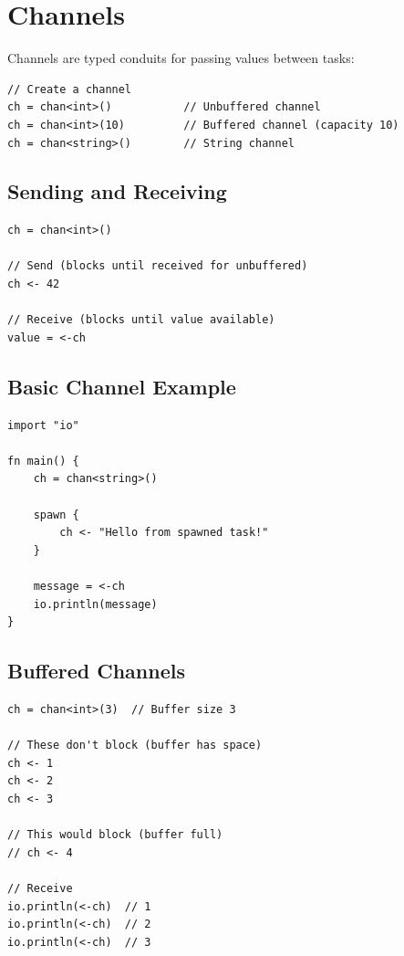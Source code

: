 \section{Channels}

Channels are typed conduits for passing values between tasks:

\begin{lstlisting}
// Create a channel
ch = chan<int>()           // Unbuffered channel
ch = chan<int>(10)         // Buffered channel (capacity 10)
ch = chan<string>()        // String channel
\end{lstlisting}

\subsection{Sending and Receiving}

\begin{lstlisting}
ch = chan<int>()

// Send (blocks until received for unbuffered)
ch <- 42

// Receive (blocks until value available)
value = <-ch
\end{lstlisting}

\subsection{Basic Channel Example}

\begin{lstlisting}
import "io"

fn main() {
    ch = chan<string>()

    spawn {
        ch <- "Hello from spawned task!"
    }

    message = <-ch
    io.println(message)
}
\end{lstlisting}

\subsection{Buffered Channels}

\begin{lstlisting}
ch = chan<int>(3)  // Buffer size 3

// These don't block (buffer has space)
ch <- 1
ch <- 2
ch <- 3

// This would block (buffer full)
// ch <- 4

// Receive
io.println(<-ch)  // 1
io.println(<-ch)  // 2
io.println(<-ch)  // 3
\end{lstlisting}

